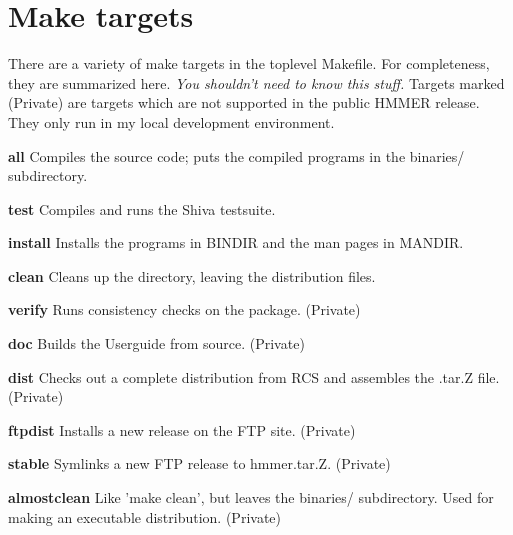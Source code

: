 \section{Make targets}

There are a variety of make targets in the toplevel Makefile.  For
completeness, they are summarized here. \textit{You shouldn't need to
know this stuff.} Targets marked (Private) are targets which are not
supported in the public HMMER release. They only run in my local
development environment.

\begin{wideitem}
\item[\textbf{all}]  Compiles the source code; puts the compiled
programs in the binaries/ subdirectory.
 
\item[\textbf{test}]  Compiles and runs the Shiva testsuite.

\item[\textbf{install}] Installs the programs in BINDIR and
the man pages in MANDIR.

\item[\textbf{clean}] Cleans up the directory, leaving the
distribution files.

\item[\textbf{verify}] Runs consistency checks on the package.
(Private)

\item[\textbf{doc}] Builds the Userguide from \latex source. (Private)

\item[\textbf{dist}] Checks out a complete distribution from RCS
and assembles the .tar.Z file. (Private)

\item[\textbf{ftpdist}] Installs a new release on the FTP
site. (Private)

\item[\textbf{stable}] Symlinks a new FTP release to hmmer.tar.Z. (Private)

\item[\textbf{almostclean}] Like 'make clean', but leaves the
binaries/ subdirectory. Used for making an executable distribution.
(Private)
\end{wideitem}







